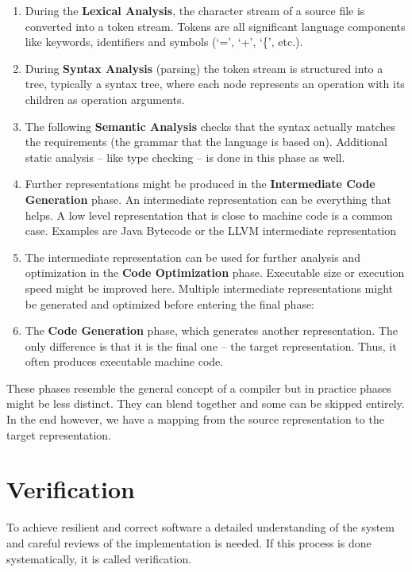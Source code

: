 \begin{enumerate}
  \item During the \textbf{Lexical Analysis}, the character stream of a source file is converted into a token stream.
  Tokens are all significant language components like keywords, identifiers and symbols (`=', `+', `\{', etc.).
  \item During \textbf{Syntax Analysis} (parsing) the token stream is structured into a tree,
  typically a syntax tree, where each node represents an operation with its children as operation arguments.
  \item The following \textbf{Semantic Analysis} checks that the syntax actually matches the requirements (the grammar that the language is based on).\newline
  Additional static analysis -- like type checking -- is done in this phase as well.
  \item Further representations might be produced in the \textbf{Intermediate Code Generation} phase.
  An intermediate representation can be everything that helps.
  A low level representation that is close to machine code is a common case.
  Examples are Java Bytecode or the LLVM intermediate representation
  \item The intermediate representation can be used for further analysis and optimization in the \textbf{Code Optimization} phase.
  Executable size or execution speed might be improved here.
  Multiple intermediate representations might be generated and optimized before entering the final phase:
  \item The \textbf{Code Generation} phase, which generates another representation.
  The only difference is that it is the final one -- the target representation.
  Thus, it often produces executable machine code.
\end{enumerate}

These phases resemble the general concept of a compiler but in practice phases might be less distinct.
They can blend together and some can be skipped entirely.
In the end however, we have a mapping from the source representation to the target representation.

\section{Verification}
\label{rel_mc}
To achieve resilient and correct software a detailed understanding of the system and careful reviews of the implementation is needed.
If this process is done systematically, it is called verification.

